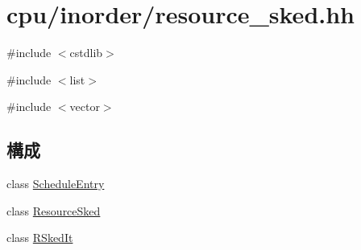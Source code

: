 \hypertarget{resource__sked_8hh}{
\section{cpu/inorder/resource\_\-sked.hh}
\label{resource__sked_8hh}
}
{\ttfamily \#include $<$cstdlib$>$}\par
{\ttfamily \#include $<$list$>$}\par
{\ttfamily \#include $<$vector$>$}\par
\subsection*{構成}
\begin{DoxyCompactItemize}
\item 
class \hyperlink{classScheduleEntry}{ScheduleEntry}
\item 
class \hyperlink{classResourceSked}{ResourceSked}
\item 
class \hyperlink{classRSkedIt}{RSkedIt}
\end{DoxyCompactItemize}
